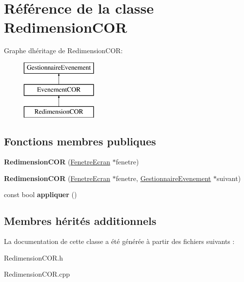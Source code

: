 \hypertarget{class_redimension_c_o_r}{}\section{Référence de la classe Redimension\+C\+OR}
\label{class_redimension_c_o_r}
Graphe d\textquotesingle{}héritage de Redimension\+C\+OR\+:\begin{figure}[H]
\begin{center}
\leavevmode
\includegraphics[height=3.000000cm]{class_redimension_c_o_r}
\end{center}
\end{figure}
\subsection*{Fonctions membres publiques}
\begin{DoxyCompactItemize}
\item 
\mbox{\label{class_redimension_c_o_r_a9176828f7658a9070f3f7401212a52e1}} 
{\bfseries Redimension\+C\+OR} (\mbox{\hyperlink{class_fenetre_ecran}{Fenetre\+Ecran}} $\ast$fenetre)
\item 
\mbox{\label{class_redimension_c_o_r_ad5b73b1a21796a9b2825b78249fd7830}} 
{\bfseries Redimension\+C\+OR} (\mbox{\hyperlink{class_fenetre_ecran}{Fenetre\+Ecran}} $\ast$fenetre, \mbox{\hyperlink{class_gestionnaire_evenement}{Gestionnaire\+Evenement}} $\ast$suivant)
\item 
\mbox{\label{class_redimension_c_o_r_aec5cb03878c15882651336a01b3ff2b2}} 
const bool {\bfseries appliquer} ()
\end{DoxyCompactItemize}
\subsection*{Membres hérités additionnels}


La documentation de cette classe a été générée à partir des fichiers suivants \+:\begin{DoxyCompactItemize}
\item 
Redimension\+C\+O\+R.\+h\item 
Redimension\+C\+O\+R.\+cpp\end{DoxyCompactItemize}
